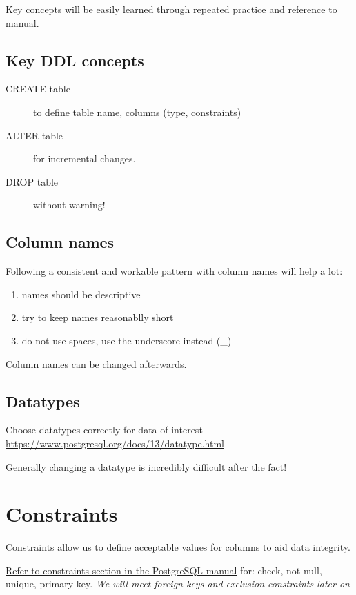 \documentclass{pgnotes}
\begin{document}
Key concepts will be easily learned through repeated practice and
reference to manual.

\subsection{Key DDL concepts}

\begin{description}
\item[CREATE table]
  to define table name, columns (type, constraints)
\item[ALTER table]
  for incremental changes.
\item[DROP table]
  without warning!
\end{description}


\subsection{Column names}

Following a consistent and workable pattern with column names will help a lot:
\begin{enumerate}
\item names should be descriptive
\item try to keep names reasonablly short
\item do not use spaces, use the underscore instead (\_)
\end{enumerate}
Column names can be changed afterwards.

\subsection{Datatypes} 

Choose datatypes correctly for data of interest\\
\url{https://www.postgresql.org/docs/13/datatype.html}

Generally changing a datatype is incredibly difficult after the fact!


\section{Constraints}
\label{sec:constraints}

Constraints allow us to define acceptable values for columns to aid data
integrity.

\href{https://www.postgresql.org/docs/14/ddl-constraints.html}{Refer to
constraints section in the PostgreSQL manual} for: check, not null,
unique, primary key. \emph{We will meet foreign keys and exclusion
constraints later on}
\end{document}
